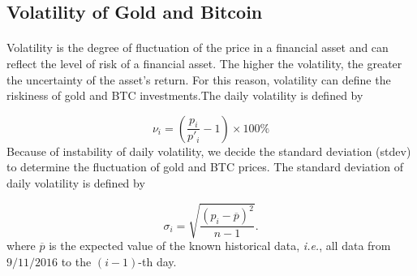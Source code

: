 \documentclass[12pt]{article}
\begin{document}
\subsection{Volatility of Gold and Bitcoin}

    \paragraph{}
    Volatility is the degree of fluctuation of the price in a financial asset and can reflect the level of risk of a financial asset. The higher the volatility, the greater the uncertainty of the asset's return. For this reason, volatility can define the riskiness of gold and BTC investments.The daily volatility is defined by

    \begin{equation}
        \nu_i=(\frac{p_i}{p'_i}-1)\times 100\%
    \end{equation}
    Because of instability of daily volatility, we decide the standard deviation (stdev) to determine the fluctuation of gold and BTC prices. 
    The standard deviation of daily volatility is defined by 
 
    \begin{equation}
        \sigma_i=\sqrt{\frac{(p_i-\overline{p})^2}{n-1}}.
    \end{equation}
    where $\overline{p}$ is the expected value of the known historical data, \emph{i.e.}, all data from $9/11/2016$ to the $(i-1)$-th day.
\end{document}
